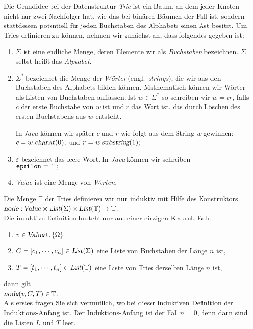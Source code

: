 Die Grundidee bei der Datenstruktur \emph{Trie} ist ein Baum, an dem jeder Knoten nicht
nur zwei Nachfolger hat, wie das bei bin\"aren B\"aumen der Fall ist, sondern stattdessen
potentiell f\"ur jeden Buchstaben des Alphabets einen Ast besitzt.  Um Tries definieren zu
k\"onnen, nehmen wir zun\"achst an, dass folgendes gegeben ist:
\begin{enumerate}
\item $\Sigma$ ist eine endliche Menge, deren Elemente wir als \emph{Buchstaben}
      bezeichnen. $\Sigma$ selbst hei{\ss}t das \emph{Alphabet}.
\item $\Sigma^*$ bezeichnet die Menge der \emph{W\"orter} (engl.~\emph{strings}), die wir aus den Buchstaben
      des Alphabets bilden k\"onnen.  Mathematisch k\"onnen wir W\"orter als Listen von 
      Buchstaben auffassen. Ist $w \in \Sigma^*$ so schreiben wir $w = cr$, falls
      $c$ der erste Buchstabe von $w$ ist und $r$ das Wort ist, das durch L\"oschen des
      ersten Buchstabens aus $w$ entsteht.  

      In \textsl{Java} k\"onnen wir sp\"ater $c$ und $r$ wie
      folgt aus dem String $w$ gewinnen: \\[0.2cm]
      \hspace*{1.3cm} $c = w.\textsl{charAt}(0)\mathtt{;}$ 
      \quad und \quad $r = w.\textsl{substring}(1)\mathtt{;}$
\item $\varepsilon$ bezeichnet das leere Wort.  In \textsl{Java} k\"onnen wir schreiben \\[0.2cm]
      \hspace*{1.3cm} $\mathtt{epsilon} = \symbol{34}\symbol{34}\mathtt{;}$ 
\item \textsl{Value} ist eine Menge von \emph{Werten}.  
\end{enumerate}
Die Menge $\mathbb{T}$ der Tries definieren wir nun induktiv mit Hilfe des 
Konstruktors \\[0.2cm]
\hspace*{1.3cm} 
$\textsl{node}: \textsl{Value} \times \textsl{List}(\Sigma) \times
\textsl{List}(\mathbb{T}) \rightarrow \mathbb{T}$. \\[0.2cm]
Die induktive Definition besteht nur aus einer einzigen Klausel. Falls
\begin{enumerate}
\item $v \in \textsl{Value} \cup \{\Omega\}$
\item $C = [c_1, \cdots, c_n] \in \textsl{List}(\Sigma)$ eine Liste von Buchstaben der
      L\"ange $n$ ist,
\item $T = [t_1, \cdots, t_n] \in \textsl{List}(\mathbb{T})$ eine Liste von Tries derselben L\"ange $n$ ist, 
\end{enumerate}
dann gilt \\[0.2cm]
\hspace*{1.3cm}  $\textsl{node}(v, C, T) \in \mathbb{T}$.  \\[0.2cm]
Als erstes fragen Sie sich
vermutlich, wo bei dieser induktiven Definition der Induktions-Anfang ist.
Der Induktions-Anfang ist der Fall $n=0$, denn dann sind die Listen $L$ und $T$ leer.

